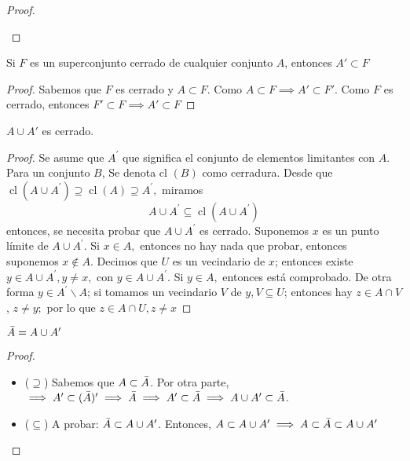 \begin{proof}
\begin{itemize}
\begin{center}
    \end{center}
\end{itemize}
\end{proof}

\begin{proposition}
Si $F$ es un superconjunto cerrado de cualquier conjunto $A$, entonces $A'\subset F$ 
\end{proposition}
\begin{proof}
Sabemos que $F$ es cerrado y $A\subset F$. Como $A\subset F\implies A'\subset F'$. Como $F$ es cerrado, entonces $F'\subset F\implies A'\subset F$
\end{proof}

\begin{proposition}
$A\cup A'$ es cerrado. 
\end{proposition}
\begin{proof}

Se asume que $A^{\prime}$ que significa el conjunto de elementos limitantes con $A$. Para un conjunto $B$, Se denota cl $(B)$ como cerradura.
Desde que $\operatorname{cl}\left(A \cup A^{\prime}\right) \supseteq \operatorname{cl}(A) \supseteq A^{\prime},$ miramos
$$
A \cup A^{\prime} \subseteq \operatorname{cl}\left(A \cup A^{\prime}\right)
$$
entonces, se necesita probar que $A \cup A^{\prime}$ es cerrado.
Suponemos $x$ es un punto límite de $A \cup A^{\prime} .$ Si $x \in A,$ entonces no hay nada que probar, entonces suponemos $x \notin A$. Decimos que $U$ es un vecindario de $x$; entonces existe $y \in A \cup A^{\prime}, y \neq x,$ con $y \in A \cup A^{\prime} .$ Si $y \in A,$ entonces está comprobado. De otra forma $y \in A^{\prime} \backslash A$; si tomamos un vecindario $V$ de $y, V \subseteq U$; entonces hay $z \in A \cap V$, $z \neq y ;$ por lo que $z \in A \cap U, z \neq x$
\end{proof}

\begin{proposition}
$\Bar{A}=A\cup A'$
\end{proposition}
\begin{proof}
\begin{itemize}
    \item ($\supseteq$) Sabemos que $A\subset \Bar{A}$. Por otra parte, $\implies  A'\subset(\Bar{A})'\implies \Bar{A}\implies A'\subset \Bar{A}\implies A\cup A'\subset \Bar{A}$.
    \item ($\subseteq$) A probar: $\Bar{A}\subset A\cup A'$. Entonces, $A\subset A\cup A'\implies A\subset \Bar{A}\subset A\cup A'$
\end{itemize}
\end{proof}

